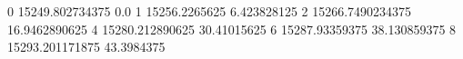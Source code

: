 0 15249.802734375 0.0
1 15256.2265625 6.423828125
2 15266.7490234375 16.9462890625
4 15280.212890625 30.41015625
6 15287.93359375 38.130859375
8 15293.201171875 43.3984375

